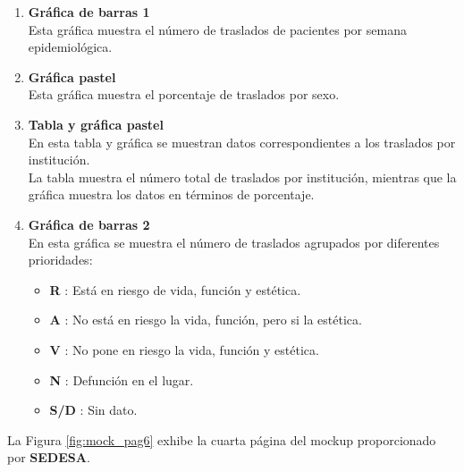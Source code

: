 \begin{enumerate}
    \item \textbf{Gráfica de barras 1}\\
    Esta gráfica muestra el número de traslados de pacientes por semana epidemiológica.

    \item \textbf{Gráfica pastel}\\
    Esta gráfica muestra el porcentaje de traslados por sexo.

    \item \textbf{Tabla y gráfica pastel}\\
    En esta tabla y gráfica se muestran datos correspondientes a los traslados por institución.\\

    La tabla muestra el número total de traslados por institución, mientras que la gráfica muestra los datos en términos de porcentaje.

    \item \textbf{Gráfica de barras 2}\\
    En esta gráfica se muestra el número de traslados agrupados por diferentes prioridades: 

    \begin{itemize}
        \item \textbf{R} : Está en riesgo de vida, función y estética.
        \item \textbf{A} : No está en riesgo la vida, función, pero si la estética.
        \item \textbf{V} :  No pone en riesgo la vida, función y estética.
        \item \textbf{N} : Defunción en el lugar.
        \item \textbf{S/D} : Sin dato.
    \end{itemize}
    
\end{enumerate}

La Figura \ref{fig:mock_pag6} exhibe la cuarta página del mockup proporcionado por \textbf{SEDESA}.

